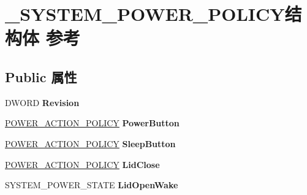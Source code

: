 \hypertarget{struct___s_y_s_t_e_m___p_o_w_e_r___p_o_l_i_c_y}{}\section{\+\_\+\+S\+Y\+S\+T\+E\+M\+\_\+\+P\+O\+W\+E\+R\+\_\+\+P\+O\+L\+I\+C\+Y结构体 参考}
\label{struct___s_y_s_t_e_m___p_o_w_e_r___p_o_l_i_c_y}
\subsection*{Public 属性}
\begin{DoxyCompactItemize}
\item 
\mbox{\label{struct___s_y_s_t_e_m___p_o_w_e_r___p_o_l_i_c_y_affbd7cab16ed08ea1209e2200cee3eee}} 
D\+W\+O\+RD {\bfseries Revision}
\item 
\mbox{\label{struct___s_y_s_t_e_m___p_o_w_e_r___p_o_l_i_c_y_a09d9834ac8db0de9ffe5008a4ca951ee}} 
\hyperlink{struct___p_o_w_e_r___a_c_t_i_o_n___p_o_l_i_c_y}{P\+O\+W\+E\+R\+\_\+\+A\+C\+T\+I\+O\+N\+\_\+\+P\+O\+L\+I\+CY} {\bfseries Power\+Button}
\item 
\mbox{\label{struct___s_y_s_t_e_m___p_o_w_e_r___p_o_l_i_c_y_aee1174aaf7b96b3221b05f70f3b57d7d}} 
\hyperlink{struct___p_o_w_e_r___a_c_t_i_o_n___p_o_l_i_c_y}{P\+O\+W\+E\+R\+\_\+\+A\+C\+T\+I\+O\+N\+\_\+\+P\+O\+L\+I\+CY} {\bfseries Sleep\+Button}
\item 
\mbox{\label{struct___s_y_s_t_e_m___p_o_w_e_r___p_o_l_i_c_y_a2c91612af72420cd223ff668f6129197}} 
\hyperlink{struct___p_o_w_e_r___a_c_t_i_o_n___p_o_l_i_c_y}{P\+O\+W\+E\+R\+\_\+\+A\+C\+T\+I\+O\+N\+\_\+\+P\+O\+L\+I\+CY} {\bfseries Lid\+Close}
\item 
\mbox{\label{struct___s_y_s_t_e_m___p_o_w_e_r___p_o_l_i_c_y_aa216502eb236e272283bdaae9618d4f2}} 
S\+Y\+S\+T\+E\+M\+\_\+\+P\+O\+W\+E\+R\+\_\+\+S\+T\+A\+TE {\bfseries Lid\+Open\+Wake}
\item 
\mbox{\label{struct___s_y_s_t_e_m___p_o_w_e_r___p_o_l_i_c_y_aae44f2add44b562120289a9212d1944e}} 

\end{DoxyCompactItemize}
